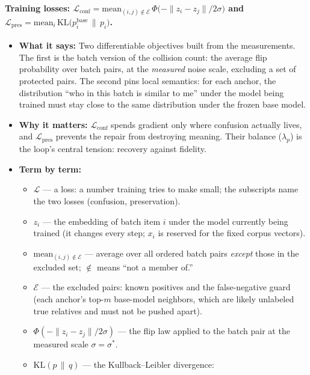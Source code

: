 \documentclass[11pt,letterpaper]{article}
\newcommand{\sstar}{\sigma^{*}}
\begin{document}
\paragraph{Training losses: $\mathcal L_{\mathrm{conf}} = \mathrm{mean}_{(i,j)
\notin \mathcal E}\, \Phi\!\big({-\lVert z_i - z_j \rVert}/{2\sigma}\big)$
and $\mathcal L_{\mathrm{pres}} = \mathrm{mean}_i\,
\mathrm{KL}\big(p_i^{\mathrm{base}} \,\|\, p_i\big)$.}
\begin{itemize}
  \item \textbf{What it says:} Two differentiable objectives built from
  the measurements. The first is the batch version of the collision count:
  the average flip probability over batch pairs, at the \emph{measured}
  noise scale, excluding a set of protected pairs. The second pins local
  semantics: for each anchor, the distribution ``who in this batch is
  similar to me'' under the model being trained must stay close to the
  same distribution under the frozen base model.
  \item \textbf{Why it matters:} $\mathcal L_{\mathrm{conf}}$ spends
  gradient only where confusion actually lives, and $\mathcal
  L_{\mathrm{pres}}$ prevents the repair from destroying meaning. Their
  balance ($\lambda_p$) is the loop's central tension: recovery against
  fidelity.
  \item \textbf{Term by term:}
  \begin{itemize}
    \item $\mathcal L$ --- a loss: a number training tries to make small;
    the subscripts name the two losses (confusion, preservation).
    \item $z_i$ --- the embedding of batch item $i$ under the model
    currently being trained (it changes every step; $x_i$ is reserved for
    the fixed corpus vectors).
    \item $\mathrm{mean}_{(i,j) \notin \mathcal E}$ --- average over all
    ordered batch pairs \emph{except} those in the excluded set; $\notin$
    means ``not a member of.''
    \item $\mathcal E$ --- the excluded pairs: known positives and the
    false-negative guard (each anchor's top-$m$ base-model neighbors,
    which are likely unlabeled true relatives and must not be pushed
    apart).
    \item $\Phi(-\lVert z_i - z_j \rVert / 2\sigma)$ --- the flip law
    applied to the batch pair at the measured scale $\sigma = \sstar$.
    \item $\mathrm{KL}(p \,\|\, q)$ --- the Kullback--Leibler divergence:

\end{itemize}
\end{itemize}
\end{document}
